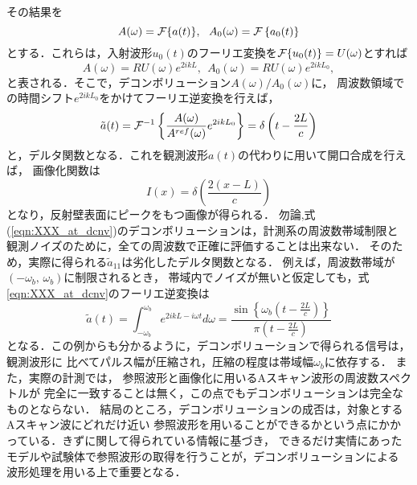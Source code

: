その結果を
\begin{equation}
	A(\omega)={\cal F}\{a(t)\}, \ \ 
	A_0(\omega)={\cal F}\left\{ a_0(t)\right\}
	\label{eqn:XXX_16}
\end{equation}
とする．これらは，入射波形$u_0(t)$のフーリエ変換を${\cal F}\{ u_0(t)\}=U(\omega)$とすれば
\begin{equation}
	A(\omega) = RU(\omega) e^{2ik L},  \ \
	A_0(\omega) = RU(\omega) e^{2ik L_0}, 
	\label{eqn:XXX_17}
\end{equation}
と表される．そこで，デコンボリューション$A(\omega)/A_0(\omega)$に，
周波数領域での時間シフト$e^{2ikL_0}$をかけてフーリエ逆変換を行えば，
\begin{equation}
	\tilde a(t)= {\cal F}^{-1} \left\{ 
	\frac{A(\omega)}{A^{ref}(\omega)} e ^{2ik L_0}
	\right\}
	=\delta \left(t-\frac{2L}{c}\right)
	\label{eqn:XXX_at_dcnv}
\end{equation}
と，デルタ関数となる．これを観測波形$a(t)$の代わりに用いて開口合成を行えば，
画像化関数は
\begin{equation}
	I(x)=\delta\left( \frac{2(x-L)}{c}\right)
	\label{eqn:XXX_}
\end{equation}
となり，反射壁表面にピークをもつ画像が得られる．
勿論,式(\ref{eqn:XXX_at_dcnv})のデコンボリューションは，計測系の周波数帯域制限と
観測ノイズのために，全ての周波数で正確に評価することは出来ない．
そのため，実際に得られる$\tilde a_{11}$は劣化したデルタ関数となる．
例えば，周波数帯域が$(-\omega_b,\, \omega_b)$に制限されるとき，
帯域内でノイズが無いと仮定しても，式\ref{eqn:XXX_at_dcnv}のフーリエ逆変換は
\begin{equation}
	\tilde a(t)= 
	\int_{-\omega_b}^{\omega_b} 
	e^{2ikL-i\omega t} d\omega 
	=\frac{\sin\left\{ \omega_b \left( t-\frac{2L}{c}\right)\right\}}{\pi \left(t-\frac{2L}{c}\right)}
	\label{eqn:XXX_18}
\end{equation}
となる．この例からも分かるように，デコンボリューションで得られる信号は，観測波形に
比べてパルス幅が圧縮され，圧縮の程度は帯域幅$\omega_b$に依存する．
また，実際の計測では， 参照波形と画像化に用いるAスキャン波形の周波数スペクトルが
完全に一致することは無く，この点でもデコンボリューションは完全なものとならない．
結局のところ，デコンボリューションの成否は，対象とするAスキャン波にどれだけ近い
参照波形を用いることができるかという点にかかっている．きずに関して得られている情報に基づき，
できるだけ実情にあったモデルや試験体で参照波形の取得を行うことが，デコンボリューションによる
波形処理を用いる上で重要となる．
